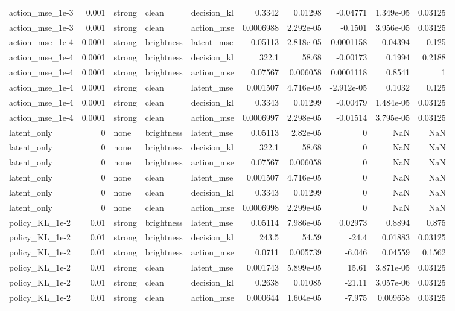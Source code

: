 \begin{tabular}{lrlllrrrrr}
action\_mse\_1e-3 & 0.001 & strong & clean & decision\_kl & 0.3342 & 0.01298 & -0.04771 & 1.349e-05 & 0.03125 \\
action\_mse\_1e-3 & 0.001 & strong & clean & action\_mse & 0.0006988 & 2.292e-05 & -0.1501 & 3.956e-05 & 0.03125 \\
action\_mse\_1e-4 & 0.0001 & strong & brightness & latent\_mse & 0.05113 & 2.818e-05 & 0.0001158 & 0.04394 & 0.125 \\
action\_mse\_1e-4 & 0.0001 & strong & brightness & decision\_kl & 322.1 & 58.68 & -0.00173 & 0.1994 & 0.2188 \\
action\_mse\_1e-4 & 0.0001 & strong & brightness & action\_mse & 0.07567 & 0.006058 & 0.0001118 & 0.8541 & 1 \\
action\_mse\_1e-4 & 0.0001 & strong & clean & latent\_mse & 0.001507 & 4.716e-05 & -2.912e-05 & 0.1032 & 0.125 \\
action\_mse\_1e-4 & 0.0001 & strong & clean & decision\_kl & 0.3343 & 0.01299 & -0.00479 & 1.484e-05 & 0.03125 \\
action\_mse\_1e-4 & 0.0001 & strong & clean & action\_mse & 0.0006997 & 2.298e-05 & -0.01514 & 3.795e-05 & 0.03125 \\
latent\_only & 0 & none & brightness & latent\_mse & 0.05113 & 2.82e-05 & 0 & NaN & NaN \\
latent\_only & 0 & none & brightness & decision\_kl & 322.1 & 58.68 & 0 & NaN & NaN \\
latent\_only & 0 & none & brightness & action\_mse & 0.07567 & 0.006058 & 0 & NaN & NaN \\
latent\_only & 0 & none & clean & latent\_mse & 0.001507 & 4.716e-05 & 0 & NaN & NaN \\
latent\_only & 0 & none & clean & decision\_kl & 0.3343 & 0.01299 & 0 & NaN & NaN \\
latent\_only & 0 & none & clean & action\_mse & 0.0006998 & 2.299e-05 & 0 & NaN & NaN \\
policy\_KL\_1e-2 & 0.01 & strong & brightness & latent\_mse & 0.05114 & 7.986e-05 & 0.02973 & 0.8894 & 0.875 \\
policy\_KL\_1e-2 & 0.01 & strong & brightness & decision\_kl & 243.5 & 54.59 & -24.4 & 0.01883 & 0.03125 \\
policy\_KL\_1e-2 & 0.01 & strong & brightness & action\_mse & 0.0711 & 0.005739 & -6.046 & 0.04559 & 0.1562 \\
policy\_KL\_1e-2 & 0.01 & strong & clean & latent\_mse & 0.001743 & 5.899e-05 & 15.61 & 3.871e-05 & 0.03125 \\
policy\_KL\_1e-2 & 0.01 & strong & clean & decision\_kl & 0.2638 & 0.01085 & -21.11 & 3.057e-06 & 0.03125 \\
policy\_KL\_1e-2 & 0.01 & strong & clean & action\_mse & 0.000644 & 1.604e-05 & -7.975 & 0.009658 & 0.03125 \\
\bottomrule
\end{tabular}
